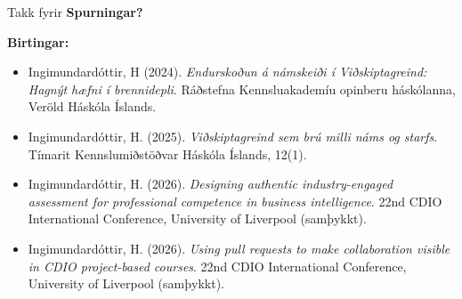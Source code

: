 \documentclass[
    NAME={Dr. Helga Ingimundardóttir},
    EMAIL={helgaingim@hi.is},
    FACULTY={Iðnaðarverkfræði},
    TITLE={Sýnileg samvinna með tólum atvinnulífsins},
    SUBTITLE={PR vinnulag og gagnsæir ferlar í verkefnadrifinni verkfræðikennslu},
    SEMINAR={Kennsluráðstefna KHA},
    DATE={28. mars 2026},
    WIDE=true,
    ICELANDIC=true
]{HI-LaTeX//hi-beamer}
\begin{document}
\begin{frame}{Takk fyrir}
\Large
{\centering
\textbf{Spurningar?}\\[18pt]
}

\small
\textbf{Birtingar:}
\begin{itemize}
  \item Ingimundardóttir, H (2024). \emph{Endurskoðun á námskeiði í Viðskiptagreind: Hagnýt hæfni í brennidepli}. Ráðstefna Kennsluakademíu opinberu háskólanna, Veröld Háskóla Íslands.

  \item Ingimundardóttir, H. (2025). \emph{Viðskiptagreind sem brú milli náms og starfs}. 
  Tímarit Kennslumiðstöðvar Háskóla Íslands, 12(1).

  \item Ingimundardóttir, H. (2026). \emph{Designing authentic industry-engaged assessment for professional competence in business intelligence}. 
  22nd CDIO International Conference, University of Liverpool (samþykkt).
  
  \item Ingimundardóttir, H. (2026). \emph{Using pull requests to make collaboration visible in CDIO project-based courses}. 
  22nd CDIO International Conference, University of Liverpool (samþykkt).


\end{itemize}

\end{frame}
\end{document}

